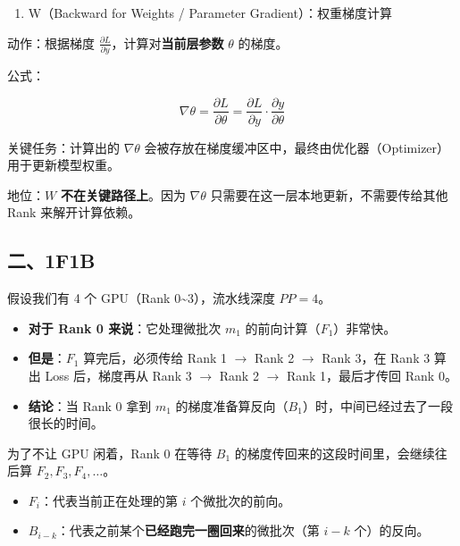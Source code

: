 \begin{enumerate}
\def\labelenumi{\arabic{enumi}.}
\setcounter{enumi}{2}
\tightlist
\item
  W（Backward for Weights / Parameter Gradient）：权重梯度计算
\end{enumerate}

动作：根据梯度 \(\frac{\partial L}{\partial y}\)，计算对\textbf{当前层参数} \(\theta\) 的梯度。

公式：

\[
\nabla \theta = \frac{\partial L}{\partial \theta} = \frac{\partial L}{\partial y} \cdot \frac{\partial y}{\partial \theta}
\]

关键任务：计算出的 \(\nabla \theta\) 会被存放在梯度缓冲区中，最终由优化器（Optimizer）用于更新模型权重。

地位：\(W\) \textbf{不在关键路径上}。因为 \(\nabla \theta\) 只需要在这一层本地更新，不需要传给其他 Rank 来解开计算依赖。

\hypertarget{ux4e8c1f1b}{%
\subsection{二、1F1B}\label{ux4e8c1f1b}}

假设我们有 4 个 GPU（Rank 0\textasciitilde3），流水线深度 \(PP = 4\)。

\begin{itemize}
\tightlist
\item
  \textbf{对于 Rank 0 来说}：它处理微批次 \(m_1\) 的前向计算（\(F_1\)）非常快。
\item
  \textbf{但是}：\(F_1\) 算完后，必须传给 Rank 1 \(\to\) Rank 2 \(\to\) Rank 3，在 Rank 3 算出 Loss 后，梯度再从 Rank 3 \(\to\) Rank 2 \(\to\) Rank 1，最后才传回 Rank 0。
\item
  \textbf{结论}：当 Rank 0 拿到 \(m_1\) 的梯度准备算反向（\(B_1\)）时，中间已经过去了一段很长的时间。
\end{itemize}

为了不让 GPU 闲着，Rank 0 在等待 \(B_1\) 的梯度传回来的这段时间里，会继续往后算 \(F_2, F_3, F_4, \dots\)。

\begin{itemize}
\tightlist
\item
  \(F_i\)：代表当前正在处理的第 \(i\) 个微批次的前向。
\item
  \(B_{i-k}\)：代表之前某个\textbf{已经跑完一圈回来}的微批次（第 \(i-k\) 个）的反向。
\end{itemize}

